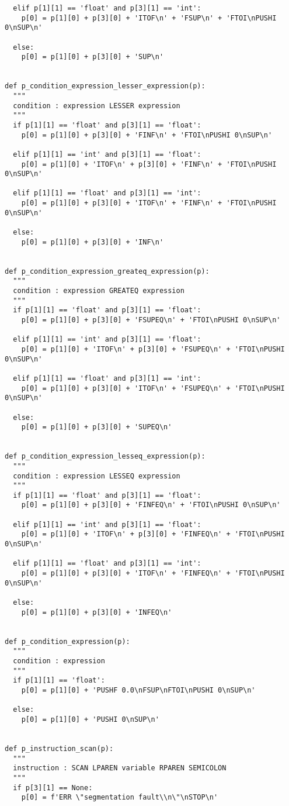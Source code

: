 \documentclass[11pt,a4paper]{report}%
\begin{document}
\begin{scriptsize}
\begin{verbatim}
  elif p[1][1] == 'float' and p[3][1] == 'int':
    p[0] = p[1][0] + p[3][0] + 'ITOF\n' + 'FSUP\n' + 'FTOI\nPUSHI 0\nSUP\n'

  else:
    p[0] = p[1][0] + p[3][0] + 'SUP\n'


def p_condition_expression_lesser_expression(p):
  """
  condition : expression LESSER expression
  """
  if p[1][1] == 'float' and p[3][1] == 'float':
    p[0] = p[1][0] + p[3][0] + 'FINF\n' + 'FTOI\nPUSHI 0\nSUP\n'

  elif p[1][1] == 'int' and p[3][1] == 'float':
    p[0] = p[1][0] + 'ITOF\n' + p[3][0] + 'FINF\n' + 'FTOI\nPUSHI 0\nSUP\n'
  
  elif p[1][1] == 'float' and p[3][1] == 'int':
    p[0] = p[1][0] + p[3][0] + 'ITOF\n' + 'FINF\n' + 'FTOI\nPUSHI 0\nSUP\n'

  else:
    p[0] = p[1][0] + p[3][0] + 'INF\n'


def p_condition_expression_greateq_expression(p):
  """
  condition : expression GREATEQ expression
  """
  if p[1][1] == 'float' and p[3][1] == 'float':
    p[0] = p[1][0] + p[3][0] + 'FSUPEQ\n' + 'FTOI\nPUSHI 0\nSUP\n'

  elif p[1][1] == 'int' and p[3][1] == 'float':
    p[0] = p[1][0] + 'ITOF\n' + p[3][0] + 'FSUPEQ\n' + 'FTOI\nPUSHI 0\nSUP\n'
  
  elif p[1][1] == 'float' and p[3][1] == 'int':
    p[0] = p[1][0] + p[3][0] + 'ITOF\n' + 'FSUPEQ\n' + 'FTOI\nPUSHI 0\nSUP\n'

  else:
    p[0] = p[1][0] + p[3][0] + 'SUPEQ\n'


def p_condition_expression_lesseq_expression(p):
  """
  condition : expression LESSEQ expression
  """
  if p[1][1] == 'float' and p[3][1] == 'float':
    p[0] = p[1][0] + p[3][0] + 'FINFEQ\n' + 'FTOI\nPUSHI 0\nSUP\n'

  elif p[1][1] == 'int' and p[3][1] == 'float':
    p[0] = p[1][0] + 'ITOF\n' + p[3][0] + 'FINFEQ\n' + 'FTOI\nPUSHI 0\nSUP\n'
  
  elif p[1][1] == 'float' and p[3][1] == 'int':
    p[0] = p[1][0] + p[3][0] + 'ITOF\n' + 'FINFEQ\n' + 'FTOI\nPUSHI 0\nSUP\n'

  else:
    p[0] = p[1][0] + p[3][0] + 'INFEQ\n'


def p_condition_expression(p):
  """
  condition : expression
  """
  if p[1][1] == 'float':
    p[0] = p[1][0] + 'PUSHF 0.0\nFSUP\nFTOI\nPUSHI 0\nSUP\n'
  
  else:
    p[0] = p[1][0] + 'PUSHI 0\nSUP\n'


def p_instruction_scan(p):
  """
  instruction : SCAN LPAREN variable RPAREN SEMICOLON
  """
  if p[3][1] == None:
    p[0] = f'ERR \"segmentation fault\\n\"\nSTOP\n'
  

\end{verbatim}
\end{scriptsize}
\end{document}
